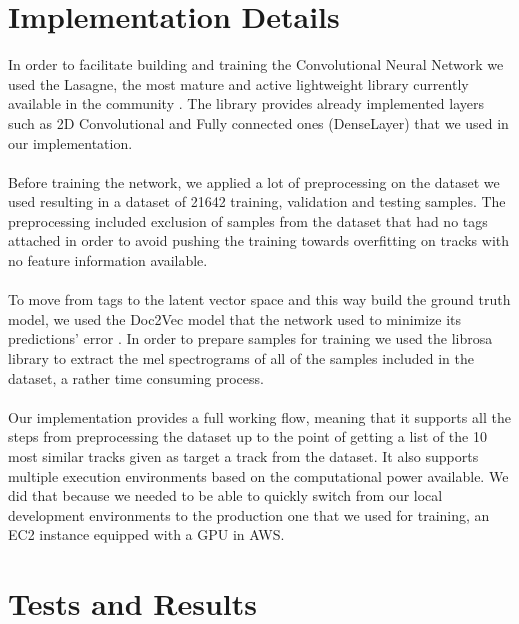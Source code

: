 \documentclass[11pt, a4paper]{article}
\begin{document}
  \section{Implementation Details}
    In order to facilitate building and training the Convolutional Neural
    Network we used the Lasagne, the most mature and active lightweight library
    currently available in the community \cite{lasagne}. The library provides
    already implemented layers such as 2D Convolutional and Fully connected
    ones (DenseLayer) that we used in our implementation.
    \\ \\
    \noindent
    Before training the network, we applied a lot of preprocessing on the
    dataset we used resulting in a dataset of 21642 training, validation and 
    testing samples. The preprocessing included exclusion of samples from the
    dataset that had no tags attached in order to avoid pushing the training
    towards overfitting on tracks with no feature information available.
    \\ \\
    \noindent
    To move from tags to the latent vector space and this way build the ground
    truth model, we used the Doc2Vec model that the network used to minimize
    its predictions' error \cite{doc2vec}. In order to prepare samples for
    training we used the librosa library \cite{librosa} to extract the mel
    spectrograms of all of the samples included in the dataset, a rather time
    consuming process.
    \\ \\
    \noindent
    Our implementation provides a full working flow, meaning that it supports
    all the steps from preprocessing the dataset up to the point of getting
    a list of the 10 most similar tracks given as target a track from the
    dataset. It also supports multiple execution environments based on the
    computational power available. We did that because we needed to be able to
    quickly switch from our local development environments to the production
    one that we used for training, an EC2 instance equipped with a GPU in AWS.
      
  \section{Tests and Results}
\end{document}
